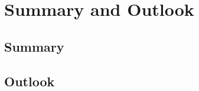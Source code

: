 \chapter{Summary and Outlook}
\label{summary}
 
\section{Summary}

\blindtext[1]

\section{Outlook}

\blindtext[1]